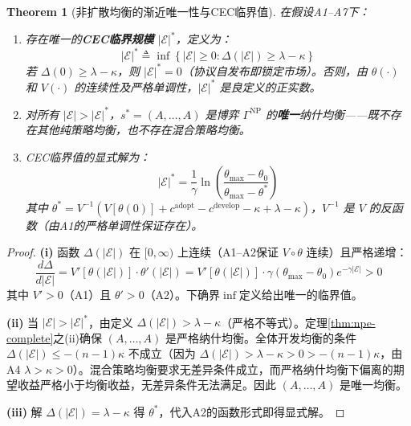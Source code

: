 \documentclass[12pt,a4paper]{ctexart}
\newtheorem{theorem}{Theorem}[section]
\theoremstyle{definition}
\theoremstyle{remark}
\begin{document}
\begin{theorem}[非扩散均衡的渐近唯一性与CEC临界值]
\label{thm:asymptotic-uniqueness}
在假设A1--A7下：

\begin{enumerate}[label=(\roman*)]
\item 存在唯一的\textbf{CEC临界规模} $|\mathcal{E}|^*$，定义为：
\begin{equation}
|\mathcal{E}|^* \triangleq \inf\left\{|\mathcal{E}| \geq 0 : \Delta(|\mathcal{E}|) \geq \lambda - \kappa\right\}
\label{eq:E-star}
\end{equation}
若 $\Delta(0) \geq \lambda - \kappa$，则 $|\mathcal{E}|^* = 0$（协议自发布即锁定市场）。否则，由 $\theta(\cdot)$ 和 $V(\cdot)$ 的连续性及严格单调性，$|\mathcal{E}|^*$ 是良定义的正实数。

\item 对所有 $|\mathcal{E}| > |\mathcal{E}|^*$，$s^* = (A, \ldots, A)$ 是博弈 $\Gamma^{\text{NP}}$ 的\textbf{唯一}纳什均衡——既不存在其他纯策略均衡，也不存在混合策略均衡。

\item CEC临界值的显式解为：
\begin{equation}
|\mathcal{E}|^* = \frac{1}{\gamma} \ln \left( \frac{\theta_{\max} - \theta_0}{\theta_{\max} - \theta^*} \right)
\end{equation}
其中 $\theta^* = V^{-1}\left(V[\theta(0)] + c^{\text{adopt}} - c^{\text{develop}} - \kappa + \lambda - \kappa\right)$，$V^{-1}$ 是 $V$ 的反函数（由A1的严格单调性保证存在）。
\end{enumerate}
\end{theorem}

\begin{proof}
\textbf{(i)} 函数 $\Delta(|\mathcal{E}|)$ 在 $[0, \infty)$ 上连续（A1--A2保证 $V \circ \theta$ 连续）且严格递增：
\begin{equation}
\frac{d\Delta}{d|\mathcal{E}|} = V'[\theta(|\mathcal{E}|)] \cdot \theta'(|\mathcal{E}|) = V'[\theta(|\mathcal{E}|)] \cdot \gamma(\theta_{\max} - \theta_0) e^{-\gamma |\mathcal{E}|} > 0
\end{equation}
其中 $V' > 0$（A1）且 $\theta' > 0$（A2）。下确界$\inf$定义给出唯一的临界值。

\textbf{(ii)} 当 $|\mathcal{E}| > |\mathcal{E}|^*$，由定义 $\Delta(|\mathcal{E}|) > \lambda - \kappa$（严格不等式）。定理\ref{thm:npe-complete}之(ii)确保 $(A, \ldots, A)$ 是严格纳什均衡。全体开发均衡的条件 $\Delta(|\mathcal{E}|) \leq -(n-1)\kappa$ 不成立（因为 $\Delta(|\mathcal{E}|) > \lambda - \kappa > 0 > -(n-1)\kappa$，由A4 $\lambda > \kappa > 0$）。混合策略均衡要求无差异条件成立，而严格纳什均衡下偏离的期望收益严格小于均衡收益，无差异条件无法满足。因此 $(A, \ldots, A)$ 是唯一均衡。

\textbf{(iii)} 解 $\Delta(|\mathcal{E}|) = \lambda - \kappa$ 得 $\theta^*$，代入A2的函数形式即得显式解。
\end{proof}
\end{document}
